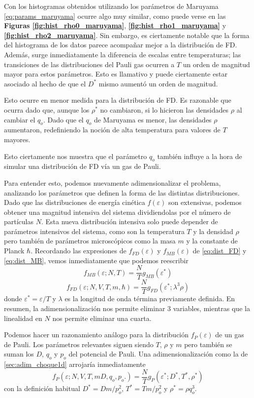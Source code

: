 Con los histogramas obtenidos utilizando los parámetros de Maruyama \eqref{eq:params_maruyama} ocurre algo muy similar, como puede verse en las \textbf{Figuras \ref{fig:hist_rho0_maruyama}}, 
\textbf{\ref{fig:hist_rho1_maruyama}} y \textbf{\ref{fig:hist_rho2_maruyama}}.
Sin embargo, es ciertamente notable que la forma del histograma de los datos parece acompañar mejor a la distribución de FD.
Además, surge inmediatamente la diferencia de escalas entre temperaturas; las transiciones de las distribuciones del Pauli gas ocurren a $T$ un orden de magnitud mayor para estos parámetros.
Esto es llamativo y puede ciertamente estar asociado al hecho de que el $D^*$ mismo aumentó un orden de magnitud.

Esto ocurre en menor medida para la distribución de FD.
Es razonable que ocurra dado que, aunque los $\rho^*$ no cambiaron, si lo hicieron las densidades $\rho$ al cambiar el $q_o$.
Dado que el $q_o$ de Maruyama es menor, las densidades $\rho$ aumentaron, redefiniendo la noción de alta temperatura para valores de $T$ mayores.

Esto ciertamente nos muestra que el parámetro $q_o$ también influye a la hora de simular una distribución de FD vía un gas de Pauli.

Para entender esto, podemos nuevamente adimensionalizar el problema, analizando los parámetros que definen la forma de las distintas distribuciones.
Dado que las distribuciones de energía cinética $f(\varepsilon)$ son extensivas, podemos obtener una magnitud intensiva del sistema dividiendolas por el número de partículas $N$.
Esta nueva distribución intensiva solo puede depender de parámetros intensivos del sistema, como son la temperatura $T$ y la densidad $\rho$ pero también de parámetros microscópicos como
la masa $m$ y la constante de Planck $\hbar$.
Recordando las expresiones de $f_{FD}(\varepsilon)$ y $f_{MB}(\varepsilon)$ de \eqref{eq:dist_FD} y \eqref{eq:dist_MB}, vemos inmediatamente que podemos reescribir
\[ f_{MB}(\varepsilon;N,T) = \frac{N}{T}g_{MB}(\varepsilon^*) \]
\[ f_{FD}(\varepsilon;N, V, T, m, \hbar) = \frac{N}{T}g_{FD}(\varepsilon^*;\lambda^3\rho) \]
donde $\varepsilon^* = \varepsilon/T$ y $\lambda$ es la longitud de onda términa previamente definida.
En resumen, la adimensionalización nos permite eliminar 3 variables, mientras que la linealidad en $N$ nos permite eliminar una cuarta.

Podemos hacer un razonamiento análogo para la distribución $f_P(\varepsilon)$ de un gas de Pauli.
Los parámetros relevantes siguen siendo $T$, $\rho$ y $m$ pero también se suman los $D$, $q_o$ y $p_o$ del potencial de Pauli.
Una adimensionalización como la de \ref{sec:adim_choque1d} arrojaría inmediatamente 
\[ f_P(\varepsilon; N,V,T, m D, q_o,p_o.) = \frac{N}{T}g_P(\varepsilon^*; D^*, T^*, \rho^*)\]
con la definición habitual $D^*=Dm/p_o^2$, $T^*=Tm/p_o^2$ y $\rho^* = \rho q_o^3$.

